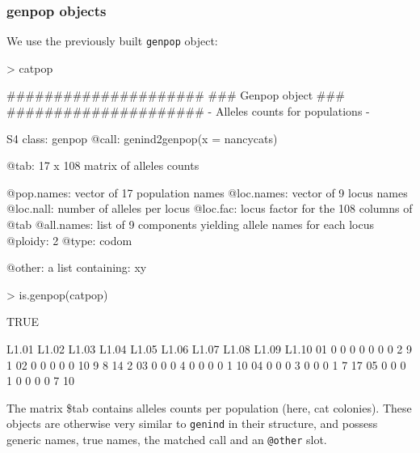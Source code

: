 \documentclass{article}
\begin{document}
\subsubsection{genpop objects}
We use the previously built \texttt{genpop} object:
\begin{Schunk}
\begin{Sinput}
> catpop
\end{Sinput}
\begin{Soutput}
       #####################
       ### Genpop object ### 
       #####################
- Alleles counts for populations - 

S4 class:  genpop
@call: genind2genpop(x = nancycats)

@tab:  17 x 108 matrix of alleles counts

@pop.names: vector of  17 population names
@loc.names: vector of  9 locus names
@loc.nall: number of alleles per locus
@loc.fac: locus factor for the  108 columns of @tab
@all.names: list of  9 components yielding allele names for each locus
@ploidy:  2
@type:  codom

@other: a list containing: xy 
\end{Soutput}
\begin{Sinput}
> is.genpop(catpop)
\end{Sinput}
\begin{Soutput}
[1] TRUE
\end{Soutput}
\begin{Soutput}
   L1.01 L1.02 L1.03 L1.04 L1.05 L1.06 L1.07 L1.08 L1.09 L1.10
01     0     0     0     0     0     0     0     2     9     1
02     0     0     0     0     0    10     9     8    14     2
03     0     0     0     4     0     0     0     0     1    10
04     0     0     0     3     0     0     0     1     7    17
05     0     0     0     1     0     0     0     0     7    10
\end{Soutput}
\end{Schunk}
The matrix \$tab contains alleles counts per population (here, cat colonies).
These objects are otherwise very similar to \texttt{genind} in their
structure, and possess generic names, true names, the matched call and
an \texttt{@other} slot.
\end{document}
